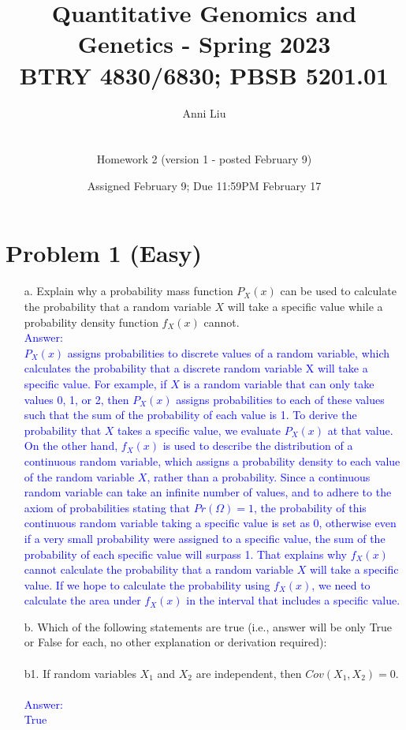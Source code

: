 \documentclass[letterpaper, 11pt]{article}
\title{Quantitative Genomics and Genetics - Spring 2023 \\
BTRY 4830/6830; PBSB 5201.01}
\author{Anni Liu \\ \\ \\ Homework 2 (version 1 - posted February 9)}
\date{Assigned February 9; Due 11:59PM February 17}                                           %
\begin{document}
\vspace{-20in}

\maketitle
\section*{Problem 1 (Easy)}

\begin{itemize}
\item[a.] Explain why a probability mass function $P_X(x)$ can be used to calculate the probability that a random variable $X$ will take a specific value while a probability density function $f_X(x)$ cannot.\\

\textcolor{blue}{Answer:\\ $P_X(x)$ assigns probabilities to discrete values of a random variable, which calculates the probability that a discrete random variable X will take a specific value. For example, if $X$ is a random variable that can only take values 0, 1, or 2, then $P_X(x)$ assigns probabilities to each of these values such that the sum of the probability of each value is 1. To derive the probability that $X$ takes a specific value, we evaluate $P_X(x)$ at that value. On the other hand, $f_X(x)$ is used to describe the distribution of a continuous random variable, which assigns a probability density to each value of the random variable $X$, rather than a probability. Since a continuous random variable can take an infinite number of values, and to adhere to the axiom of probabilities stating that $Pr(\Omega) = 1$, the probability of this continuous random variable taking a specific value is set as 0, otherwise even if a very small probability were assigned to a specific value, the sum of the probability of each specific value will surpass 1. That explains why $f_X(x)$ cannot calculate the probability that a random variable $X$ will take a specific value. If we hope to calculate the probability using $f_X(x)$, we need to calculate the area under $f_X(x)$ in the interval that includes a specific value. }\\

\item[b.] Which of the following statements are true (i.e., answer will be only True or False for each, no other explanation or derivation required):\\
\\
b1. If random variables $X_1$ and $X_2$ are independent, then $Cov(X_1,X_2) = 0$.\\
\\
\textcolor{blue}{Answer:\\ True}\\


\end{itemize}
\end{document}
